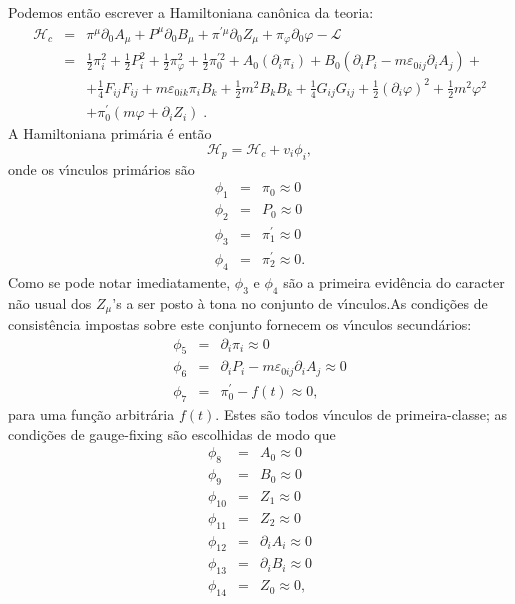 \documentclass[a4paper,thmsa,12pt]{report}
\begin{document}
Podemos ent\~{a}o escrever a Hamiltoniana can\^{o}nica da teoria: 
\begin{eqnarray}
\mathcal{H}_{c} &=&\pi ^{\mu }\partial _{0}A_{\mu }+P^{\mu }\partial
_{0}B_{\mu }+\pi ^{\prime \mu }\partial _{0}Z_{\mu }+\pi _{\varphi }\partial
_{0}\varphi -\mathcal{L}  \nonumber \\
&=&\frac{1}{2}\pi _{i}^{2}+\frac{1}{2}P_{i}^{2}+\frac{1}{2}\pi _{\varphi
}^{2}+\frac{1}{2}\pi _{0}^{\prime 2}+A_{0}\left( \partial _{i}\pi
_{i}\right) +B_{0}\left( \partial _{i}P_{i}-m\varepsilon _{0ij}\partial
_{i}A_{j}\right) +  \nonumber \\
&&+\frac{1}{4}F_{ij}F_{ij}+m\varepsilon _{0ik}\pi _{i}B_{k}+\frac{1}{2}%
m^{2}B_{k}B_{k}+\frac{1}{4}G_{ij}G_{ij}+\frac{1}{2}\left( \partial
_{i}\varphi \right) ^{2}+\frac{1}{2}m^{2}\varphi ^{2}  \nonumber \\
&&+\pi _{0}^{\prime }\left( m\varphi +\partial _{i}Z_{i}\right) \;.
\label{353}
\end{eqnarray}
A Hamiltoniana prim\'{a}ria \'{e} ent\~{a}o 
\begin{equation}
\mathcal{H}_{p}=\mathcal{H}_{c}+v_{i}\phi _{i},  \label{354}
\end{equation}
onde os v\'{\i}nculos prim\'{a}rios s\~{a}o 
\begin{eqnarray}
\phi _{1} &=&\pi _{0}\approx 0  \nonumber \\
\phi _{2} &=&P_{0}\approx 0  \nonumber \\
\phi _{3} &=&\pi _{1}^{\prime }\approx 0  \nonumber \\
\phi _{4} &=&\pi _{2}^{\prime }\approx 0.  \label{355}
\end{eqnarray}
Como se pode notar imediatamente, $\phi _{3}$ e $\phi _{4}$ s\~{a}o a
primeira evid\^{e}ncia do caracter n\~{a}o usual dos $Z_{\mu }$'s a ser
posto \`{a} tona no conjunto de v\'{\i}nculos.As condi\c{c}\~{o}es de
consist\^{e}ncia impostas sobre este conjunto fornecem os v\'{\i}nculos
secund\'{a}rios: 
\begin{eqnarray}
\phi _{5} &=&\partial _{i}\pi _{i}\approx 0  \nonumber \\
\phi _{6} &=&\partial _{i}P_{i}-m\varepsilon _{0ij}\partial _{i}A_{j}\approx
0  \nonumber \\
\phi _{7} &=&\pi _{0}^{\prime }-f\left( t\right) \approx 0,  \label{356}
\end{eqnarray}
para uma fun\c{c}\~{a}o arbitr\'{a}ria $f(t)$. Estes s\~{a}o todos
v\'{\i}nculos de primeira-classe; as condi\c{c}\~{o}es de gauge-fixing
s\~{a}o escolhidas de modo que 
\begin{eqnarray}
\phi _{8} &=&A_{0}\approx 0  \nonumber \\
\phi _{9} &=&B_{0}\approx 0  \nonumber \\
\phi _{10} &=&Z_{1}\approx 0  \nonumber \\
\phi _{11} &=&Z_{2}\approx 0  \nonumber \\
\phi _{12} &=&\partial _{i}A_{i}\approx 0  \nonumber \\
\phi _{13} &=&\partial _{i}B_{i}\approx 0  \nonumber \\
\phi _{14} &=&Z_{0}\approx 0,  \label{357}
\end{eqnarray}
\end{document}

